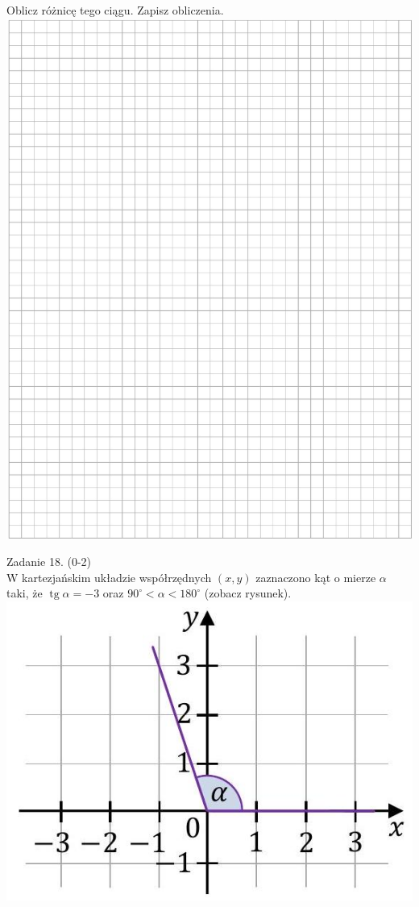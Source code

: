 \documentclass[10pt]{article}
\begin{document}
Oblicz różnicę tego ciągu. Zapisz obliczenia.\\
\includegraphics[max width=\textwidth, center]{2024_11_21_daeb5e5efb43dd4cb535g-17}

Zadanie 18. (0-2)\\
W kartezjańskim układzie współrzędnych \((x, y)\) zaznaczono kąt o mierze \(\alpha\) taki, że \(\operatorname{tg} \alpha=-3\) oraz \(90^{\circ}<\alpha<180^{\circ}\) (zobacz rysunek).\\
\includegraphics[max width=\textwidth, center]{2024_11_21_daeb5e5efb43dd4cb535g-18}
\end{document}
